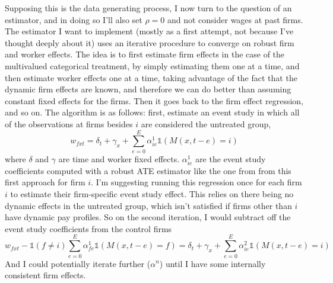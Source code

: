 \documentclass{article}
\begin{document}


Supposing this is the data generating process, I now turn to the question of an estimator, and in doing so I'll also set $\rho = 0$ and not consider wages at past firms. The estimator I want to implement (mostly as a first attempt, not because I've thought deeply about it) uses an iterative procedure to converge on robust firm and worker effects. The idea is to first estimate firm effects in the case of the multivalued categorical treatment, by simply estimating them one at a time, and then estimate worker effects one at a time, taking advantage of the fact that the dynamic firm effects are known, and therefore we can do better than assuming constant fixed effects for the firms. Then it goes back to the firm effect regression, and so on. The algorithm is as follows: first, estimate an event study in which all of the observations at firms besides $i$ are considered the untreated group,
$$w_{fxt} = \delta_t + \gamma_x + \sum_{e=0}^E \alpha^1_{ie} \mathbb{1} (M(x,t-e) = i)$$
where $\delta$ and $\gamma$ are time and worker fixed effects. $\alpha^1_{ie}$ are the event study coefficients computed with a robust ATE estimator like the one from \citet{sun2021estimating} from this first approach for firm $i$. I'm suggesting running this regression once for each firm $i$ to estimate their firm-specific event study effect. This relies on there being no dynamic effects in the untreated group, which isn't satisfied if firms other than $i$ have dynamic pay profiles. So on the second iteration, I would subtract off the event study coefficients from the control firms
$$w_{fxt} - \mathbb{1} (f \neq i) \sum_{e=0}^E \alpha^1_{fe} \mathbb{1} (M(x,t-e) = f)=\delta_t + \gamma_x + \sum_{e=0}^E \alpha^2_{ie} \mathbb{1} (M(x,t-e) = i)$$
And I could potentially iterate further ($\alpha^n$) until I have some internally consistent firm effects.
\end{document}
